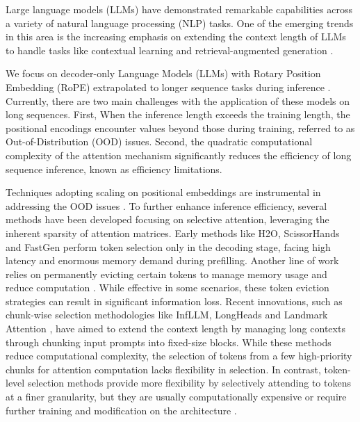 Large language models (LLMs) have demonstrated remarkable capabilities across a variety of natural language processing (NLP) tasks.
One of the emerging trends in this area is the increasing emphasis on extending the context length of LLMs to handle tasks like contextual learning and retrieval-augmented generation \citep{dong2022survey,gao2023retrieval}. 

We focus on decoder-only Language Models (LLMs) with Rotary Position Embedding (RoPE) extrapolated to longer sequence tasks during inference \citep{su2024roformer}. 
Currently, there are two main challenges with the application of these models on long sequences.
First, When the inference length exceeds the training length, the positional encodings encounter values beyond those during training, referred to as Out-of-Distribution (OOD) issues.
Second, the quadratic computational complexity of the attention mechanism significantly reduces the efficiency of long sequence inference, known as efficiency limitations.

Techniques adopting scaling on positional embeddings are instrumental in addressing the OOD issues \citep{bloc97ntk, peng2023yarn}.
To further enhance inference efficiency, several methods have been developed focusing on selective attention, leveraging the inherent sparsity of attention matrices\citep{zhang2024h2o, Jiang:2024}. 
Early methods like H2O, ScissorHands and FastGen  \citep{zhang2024h2o,liu2024scissorhands,ge2023model} perform token selection only in the decoding stage, facing high latency and enormous memory demand during prefilling.
Another line of work relies on permanently evicting certain tokens to manage memory usage and reduce computation \citep{xiao2023efficient, han2023lm, li2024snapkv}. While effective in some scenarios, these token eviction strategies can result in significant information loss. 
Recent innovations, such as chunk-wise selection methodologies like InfLLM, LongHeads and Landmark Attention \citep{xiao2024infllm, lu2024longheads, mohtashami2023landmark}, have aimed to extend the context length by managing long contexts through chunking input prompts into fixed-size blocks. 
While these methods reduce computational complexity, the selection of tokens from a few high-priority chunks for attention computation lacks flexibility in selection.
In contrast, token-level selection methods provide more flexibility by selectively attending to tokens at a finer granularity, but they are usually computationally expensive or require further training and modification on the architecture \citep{wu2022memorizing, bertsch2024unlimiformer}. 

